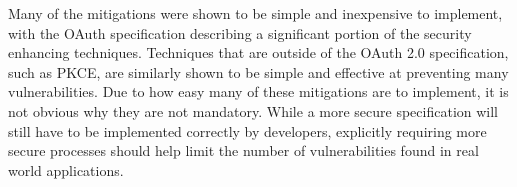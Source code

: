Many of the mitigations were shown to be simple and inexpensive to implement, with the OAuth specification describing a significant portion of the security enhancing techniques.
Techniques that are outside of the OAuth 2.0 specification, such as PKCE, are similarly shown to be simple and effective at preventing many vulnerabilities.
Due to how easy many of these mitigations are to implement, it is not obvious why they are not mandatory.
While a more secure specification will still have to be implemented correctly by developers, explicitly requiring more secure processes should help limit the number of vulnerabilities found in real world applications.



\clearpage
